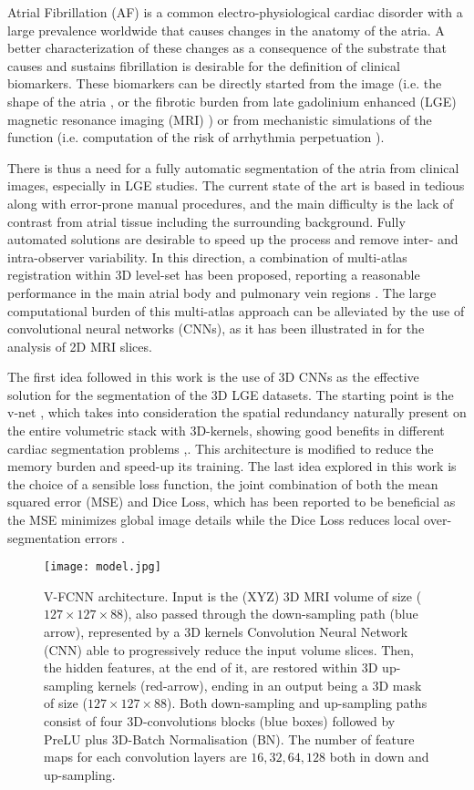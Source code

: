 \documentclass{llncs}
\begin{document}
Atrial Fibrillation (AF) is a common electro-physiological cardiac disorder with a large prevalence worldwide \cite{Prystowsky} that causes changes in the anatomy of the atria. A better characterization of these changes as a consequence of the substrate that causes and sustains fibrillation is desirable for the definition of clinical biomarkers. These biomarkers can be directly started from the image (i.e. the shape of the atria \cite{Varela17}, or the fibrotic burden from late gadolinium enhanced (LGE) magnetic resonance imaging (MRI) \cite{Kim}) or from mechanistic simulations of the function (i.e. computation of the risk of arrhythmia perpetuation \cite{Boyle16}).

There is thus a need for a fully automatic segmentation of the atria from clinical images, especially in LGE studies. The current state of the art is based in tedious along with error-prone manual procedures, and the main difficulty is the lack of contrast from atrial tissue including the surrounding background. Fully automated solutions are desirable to speed up the process and remove inter- and intra-observer variability. In this direction, a combination of multi-atlas registration within 3D level-set has been proposed, reporting a reasonable performance in the main atrial body and pulmonary vein regions \cite{Tao}. The large computational burden of this multi-atlas approach can be alleviated by the use of convolutional neural networks (CNNs), as it has been illustrated in \cite{Aliasghar} for the analysis of 2D MRI slices.

The first idea followed in this work is the use of 3D CNNs as the effective solution for the segmentation of the 3D LGE datasets. The starting point is the v-net \cite{Fausto}, which takes into consideration the spatial redundancy naturally present on the entire volumetric stack with 3D-kernels, showing good benefits in different cardiac segmentation problems \cite{Isensee},\cite{Hinrich}. This architecture is modified to reduce the memory burden and speed-up its training. The last idea explored in this work is the choice of a sensible loss function, the joint combination of both the mean squared error (MSE) and Dice Loss, which has been reported to be beneficial as the MSE minimizes global image details while the Dice Loss reduces local over-segmentation errors \cite{Fausto}.


\begin{figure*}[ht]
\centering
 \texttt{[image: model.jpg]}
   \caption{V-FCNN architecture. Input is the (XYZ) 3D MRI volume of size ($127\times127\times 88$), also passed through the down-sampling path (blue arrow),
represented by a 3D kernels Convolution Neural Network (CNN) able to progressively reduce the input volume slices.
Then, the hidden features, at the end of it, are restored within 3D up-sampling kernels (red-arrow), ending in an output being a 3D mask of size ($127\times127\times 88$). Both down-sampling and up-sampling paths consist of four 3D-convolutions blocks (blue boxes) followed by PreLU plus 3D-Batch Normalisation (BN). The number of feature maps for each convolution layers are $16,32,64,128$ both in down and up-sampling.}
\label{fig:fig1}
\end{figure*}
\end{document}
